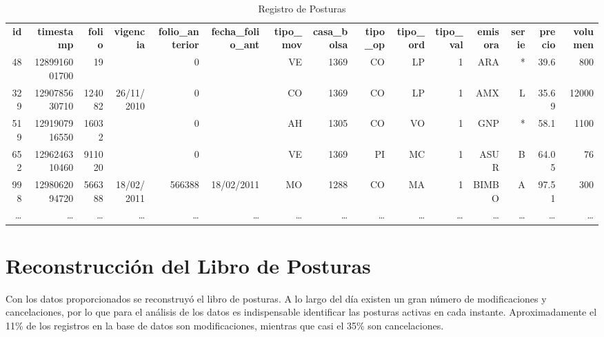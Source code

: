 \documentclass[11pt]{article}
\numberwithin{equation}{section} %
\begin{document}
\begin{landscape}
\begin{table}[htbp]\scriptsize
\centering
\caption{ Registro de Posturas}
\setlength\tabcolsep{1.25pt}
\begin{tabular}{rrrrrrrrrrrrrrr}
\textbf{ id}    & \textbf{timestamp} & \textbf{folio} & \textbf{vigencia} & \textbf{folio\_anterior} & \textbf{fecha\_folio\_ant} & \textbf{tipo\_mov} & \textbf{casa\_bolsa} & \textbf{tipo\_op} & \textbf{tipo\_ord} & \textbf{tipo\_val} & \textbf{emisora} & \textbf{serie} & \textbf{precio} & \textbf{volumen} \\
48 & 1289916001700 & 19    &       & 0     &       & VE    & 1369  & CO    & LP    & 1     & ARA & *     & 39.6  & 800 \\
329 & 1290785630710 & 124082 & 26/11/2010 & 0     &       & CO    & 1369  & CO    & LP    & 1     & AMX   & L     & 35.69 & 12000 \\
519 & 1291907916550 & 16032 &       & 0     &       & AH    & 1305  & CO    & VO    & 1     & GNP & *     & 58.1  & 1100 \\
652 & 1296246310460 & 911020 &       & 0     &       & VE    & 1369  & PI    & MC    & 1     & ASUR  & B     & 64.05 & 76 \\
998 & 1298062094720 & 566388 & 18/02/2011 & 566388 & 18/02/2011 & MO    & 1288  & CO    & MA    & 1     & BIMBO & A     & 97.51 & 300 \\
\ldots & \ldots & \ldots & \ldots & \ldots & \ldots & \ldots & \ldots & \ldots & \ldots & \ldots & \ldots & \ldots & \ldots & \ldots \\
\end{tabular}%
\label{tab:regposturasl}%
\end{table}%

\end{landscape}

\clearpage

\section{Reconstrucción del Libro de Posturas}

Con los datos proporcionados se reconstruyó el libro de posturas. A lo largo del día existen un gran número de modificaciones y cancelaciones, por lo que para el análisis de los datos es indispensable identificar las posturas activas en cada instante. Aproximadamente el 11\% de los registros en la base de datos son modificaciones, mientras que casi el 35\% son cancelaciones.\\
\end{document}
